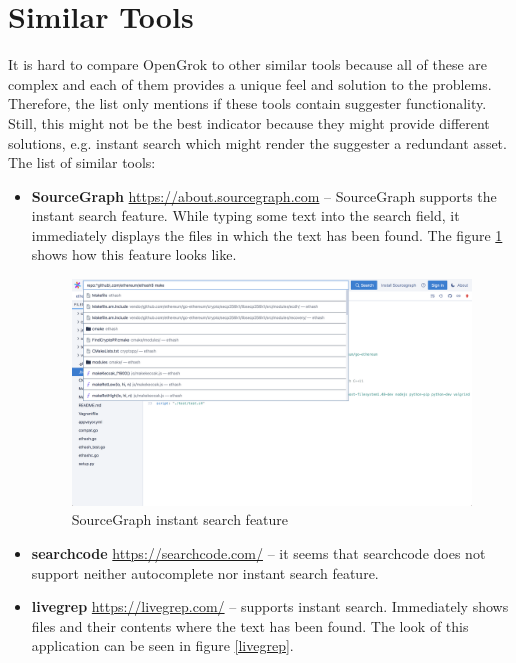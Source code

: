 \section{Similar Tools}
It is hard to compare OpenGrok to other similar tools because all of these are complex and each of them provides a unique
feel and solution to the problems.
Therefore, the list only mentions if these tools contain suggester functionality. Still, this might not be the best
indicator because they might provide different solutions, e.g. instant search which might render the suggester a redundant asset.
The list of similar tools:
\begin{itemize}
    \item \textbf{SourceGraph} \url{https://about.sourcegraph.com} – SourceGraph supports the instant search feature.
    While typing some text into the search field, it immediately displays the files in which the text has been found. The figure
    \ref{sourcegraph} shows how this feature looks like.

    \begin{figure}[htbp]
        \centering
        \includegraphics[width=145mm]{../img/sourcegraph.png}
        \caption{SourceGraph instant search feature}
        \label{sourcegraph}
    \end{figure}

    \item \textbf{searchcode} \url{https://searchcode.com/} – it seems that searchcode does not support neither
    autocomplete nor instant search feature.

    \item \textbf{livegrep} \url{https://livegrep.com/} – supports instant search. Immediately shows files and their contents
    where the text has been found. The look of this application can be seen in figure \ref{livegrep}.


\end{itemize}

